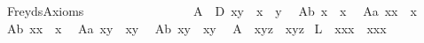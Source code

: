 \begin{isabellebody}
\isanewline
{}\isamarkupfalse%
\ FreydsAxioms\ \ \ \ \ \ \ \ \ \ \ \ \ \ \ \ \isanewline
\ A{}{\isacharcolon}\ \ {\isachardoublequoteopen}{\isacharparenleft}D\ x{\isasymcdot}y{\isacharparenright}\ \isactrlbold {\isasymleftrightarrow}\ {\isacharparenleft}{\isacharparenleft}x{\isasymbox}{\isacharparenright}\ {\isasymapprox}\ {\isacharparenleft}{\isasymbox}y{\isacharparenright}{\isacharparenright}{\isachardoublequoteclose}\ \isanewline
\isanewline
\ A{}b{\isacharcolon}\ {\isachardoublequoteopen}{\isasymbox}{\isacharparenleft}x{\isasymbox}{\isacharparenright}\ {\isasymapprox}\ {\isasymbox}x{\isachardoublequoteclose}\ \isanewline
\ A{}a{\isacharcolon}\ {\isachardoublequoteopen}{\isacharparenleft}{\isasymbox}x{\isacharparenright}{\isasymcdot}x\ {\isasymapprox}\ x{\isachardoublequoteclose}\ \isanewline
\ A{}b{\isacharcolon}\ {\isachardoublequoteopen}x{\isasymcdot}{\isacharparenleft}x{\isasymbox}{\isacharparenright}\ {\isasymapprox}\ x{\isachardoublequoteclose}\ \isanewline
\ A{}a{\isacharcolon}\ {\isachardoublequoteopen}{\isasymbox}{\isacharparenleft}x{\isasymcdot}y{\isacharparenright}\ {\isasymapprox}\ {\isasymbox}{\isacharparenleft}x{\isasymcdot}{\isacharparenleft}{\isasymbox}y{\isacharparenright}{\isacharparenright}{\isachardoublequoteclose}\ \isanewline
\ A{}b{\isacharcolon}\ {\isachardoublequoteopen}{\isacharparenleft}x{\isasymcdot}y{\isacharparenright}{\isasymbox}\ {\isasymapprox}\ {\isacharparenleft}{\isacharparenleft}x{\isasymbox}{\isacharparenright}{\isasymcdot}y{\isacharparenright}{\isasymbox}{\isachardoublequoteclose}\ \isanewline
\ A{}{\isacharcolon}\ \ {\isachardoublequoteopen}x{\isasymcdot}{\isacharparenleft}y{\isasymcdot}z{\isacharparenright}\ {\isasymapprox}\ {\isacharparenleft}x{\isasymcdot}y{\isacharparenright}{\isasymcdot}z{\isachardoublequoteclose}\isanewline
\isanewline
\isanewline
{}\isamarkupfalse%
\ L{}{\isacharcolon}\ \ {\isachardoublequoteopen}{\isacharparenleft}{\isasymbox}{\isasymbox}x{\isacharparenright}{\isasymcdot}{\isacharparenleft}{\isacharparenleft}{\isasymbox}x{\isacharparenright}{\isasymcdot}x{\isacharparenright}\ {\isasymapprox}\ {\isacharparenleft}{\isacharparenleft}{\isasymbox}{\isasymbox}x{\isacharparenright}{\isasymcdot}{\isacharparenleft}{\isasymbox}x{\isacharparenright}{\isacharparenright}{\isasymcdot}x{\isachardoublequoteclose}%
\isadelimproof
\ \ %
\endisadelimproof
%
\isatagproof

\end{isabellebody}
